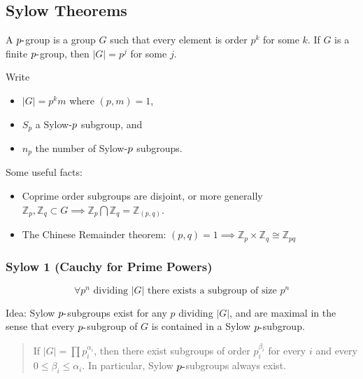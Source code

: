 \hypertarget{sylow-theorems}{%
\subsection{Sylow Theorems}\label{sylow-theorems}}

A \(p{\hbox{-}}\)group is a group \(G\) such that every element is order
\(p^k\) for some \(k\). If \(G\) is a finite \(p{\hbox{-}}\)group, then
\({\left\lvert {G} \right\rvert} = p^j\) for some \(j\).

Write

\begin{itemize}
\tightlist
\item
  \({\left\lvert {G} \right\rvert} = p^k m\) where \((p, m) = 1\),
\item
  \(S_p\) a Sylow\({\hbox{-}}p\) subgroup, and
\item
  \(n_p\) the number of Sylow\({\hbox{-}}p\) subgroups.
\end{itemize}

Some useful facts:

\begin{itemize}
\item
  Coprime order subgroups are disjoint, or more generally
  \({\mathbb{Z}}_p, {\mathbb{Z}}_q \subset G \implies {\mathbb{Z}}_p \bigcap{\mathbb{Z}}_q = {\mathbb{Z}}_{(p,q)}\).
\item
  The Chinese Remainder theorem:
  \((p, q) = 1 \implies {\mathbb{Z}}_p \times {\mathbb{Z}}_q \cong {\mathbb{Z}}_{pq}\)
\end{itemize}

\hypertarget{sylow-1-cauchy-for-prime-powers}{%
\subsubsection{Sylow 1 (Cauchy for Prime
Powers)}\label{sylow-1-cauchy-for-prime-powers}}

\[
\forall p^n \text{ dividing } {\left\lvert {G} \right\rvert} \text{ there exists a subgroup of size } p^n
\]

Idea: Sylow \(p{\hbox{-}}\)subgroups exist for any \(p\) dividing
\({\left\lvert {G} \right\rvert}\), and are maximal in the sense that
every \(p{\hbox{-}}\)subgroup of \(G\) is contained in a Sylow
\(p{\hbox{-}}\)subgroup.

\begin{quote}
If \({\left\lvert {G} \right\rvert} = \prod p_i^{\alpha_i}\), then there
exist subgroups of order \(p_i^{\beta_i}\) for every \(i\) and every
\(0 \leq \beta_i \leq \alpha_i\). In particular, Sylow
\(p{\hbox{-}}\)subgroups always exist.
\end{quote}

